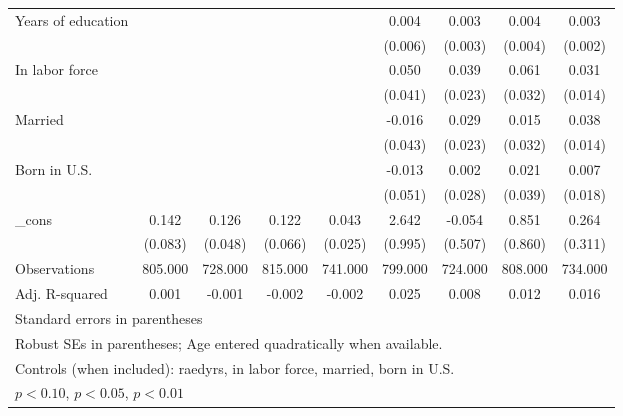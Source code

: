 \begin{table}[htbp]
\begin{tabular}{l*{8}{c}}
Years of education&                  &                  &                  &                  &    0.004         &    0.003         &    0.004         &    0.003         \\
          &                  &                  &                  &                  &  (0.006)         &  (0.003)         &  (0.004)         &  (0.002)         \\
In labor force&                  &                  &                  &                  &    0.050         &    0.039\sym{*}  &    0.061\sym{*}  &    0.031\sym{**} \\
          &                  &                  &                  &                  &  (0.041)         &  (0.023)         &  (0.032)         &  (0.014)         \\
Married   &                  &                  &                  &                  &   -0.016         &    0.029         &    0.015         &    0.038\sym{***}\\
          &                  &                  &                  &                  &  (0.043)         &  (0.023)         &  (0.032)         &  (0.014)         \\
Born in U.S.&                  &                  &                  &                  &   -0.013         &    0.002         &    0.021         &    0.007         \\
          &                  &                  &                  &                  &  (0.051)         &  (0.028)         &  (0.039)         &  (0.018)         \\
\_cons    &    0.142\sym{*}  &    0.126\sym{***}&    0.122\sym{*}  &    0.043\sym{*}  &    2.642\sym{***}&   -0.054         &    0.851         &    0.264         \\
          &  (0.083)         &  (0.048)         &  (0.066)         &  (0.025)         &  (0.995)         &  (0.507)         &  (0.860)         &  (0.311)         \\
\midrule
Observations&  805.000         &  728.000         &  815.000         &  741.000         &  799.000         &  724.000         &  808.000         &  734.000         \\
Adj. R-squared&    0.001         &   -0.001         &   -0.002         &   -0.002         &    0.025         &    0.008         &    0.012         &    0.016         \\
\bottomrule
\multicolumn{9}{l}{\footnotesize Standard errors in parentheses}\\
\multicolumn{9}{l}{\footnotesize Robust SEs in parentheses; Age entered quadratically when available.}\\
\multicolumn{9}{l}{\footnotesize Controls (when included): raedyrs, in labor force, married, born in U.S.}\\
\multicolumn{9}{l}{\footnotesize \sym{*} \(p<0.10\), \sym{**} \(p<0.05\), \sym{***} \(p<0.01\)}\\
\end{tabular}
\end{table}
